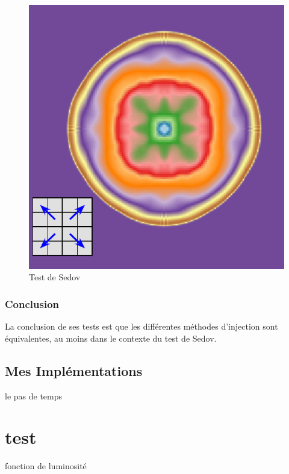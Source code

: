 \begin{figure}[htpb]
		\includegraphics[height=.3\textheight]{img/03/sedov/slice_kin.pdf} 
        \caption{Test de Sedov}
 		\label{fig:sedovslice}
\end{figure}



\subsubsection{Conclusion}

La conclusion de ses tests est que les différentes méthodes d'injection sont équivalentes, au moins dans le contexte du test de Sedov.


\subsection{Mes Implémentations}



le pas de temps\\
\section{test}
fonction de luminosité 
